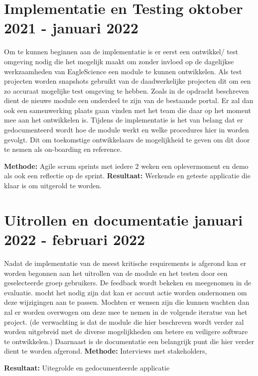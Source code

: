 \section{Implementatie en Testing \textbf{oktober 2021 - januari 2022 }}\label{sec:implementatie-en-testing}
Om te kunnen beginnen aan de implementatie is er eerst een ontwikkel/ test omgeving nodig die het mogelijk maakt om zonder invloed op de dagelijkse werkzaamheden van EagleScience een module te kunnen ontwikkelen. Als test projecten worden snapshots gebruikt van de daadwerkelijke projecten dit om een zo accuraat mogelijke test omgeving te hebben. Zoals in de opdracht beschreven dient de nieuwe module een onderdeel te zijn van de bestaande portal. Er zal dan ook een samenwerking plaats gaan vinden met het team die daar op het moment mee aan het ontwikkelen is. Tijdens de implementatie is het van belang dat er gedocumenteerd wordt hoe de module werkt en welke procedures hier in worden gevolgt. Dit om toekomstige ontwikkelaars de mogelijkheid te geven om dit door te nemen als on-boarding en reference.

\textbf{Methode:} Agile scrum sprints met iedere 2 weken een oplevermoment en demo als ook een reflectie op de sprint.
\textbf{Resultaat:} Werkende en geteste applicatie die klaar is om uitgerold te worden.

\section{Uitrollen en documentatie \textbf{januari 2022 - februari 2022 }}\label{sec:uitrollen-en-documentatie}
Nadat de implementatie van de meest kritische requirements is afgerond kan er worden begonnen aan het uitrollen van de module en het testen door een geselecteerde groep gebruikers. De feedback wordt bekeken en meegenomen in de evaluatie. mocht het nodig zijn dat kan er accuut actie worden ondernomen om deze wijzigingen aan te passen. Mochten er wensen zijn die kunnen wachten dan zal er worden overwogen om deze mee te nemen in de volgende iteratue van het project. (de verwachting is dat de module die hier beschreven wordt verder zal worden uitgebreid met de diverse mogelijkheden om betere en veiligere software te ontwikkelen.) Daarnaast is de documentatie een belangrijk punt die hier verder dient te worden afgerond.
\textbf{Methode:} Interviews met stakeholders,

\textbf{Resultaat:} Uitegrolde en gedocumenteerde applicatie
